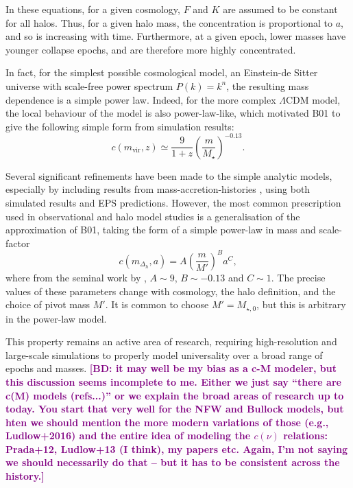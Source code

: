 \documentclass[5p]{elsarticle}
\newcommand{\bd}[1]{\textcolor{purple}{\textbf{[BD: #1]}}}
\begin{document}
In these equations, for a given cosmology, $F$ and $K$ are assumed to be constant for all halos. Thus, for a given halo mass, the concentration is proportional to $a$, and so is increasing with time. Furthermore, at a given epoch, lower masses have younger collapse epochs, and are therefore more highly concentrated. 

In fact, for the simplest possible cosmological model, an Einstein-de Sitter universe with scale-free power spectrum $P(k) = k^n$, the resulting mass dependence is a simple power law. Indeed, for the more complex $\Lambda$CDM model, the local behaviour of the model is also power-law-like, which motivated B01 to give the following simple form from simulation results:
\begin{equation}
    c(m_\text{vir},z) \simeq \frac{9}{1+z}\left(\frac{m}{M_\star}\right)^{-0.13}.
\end{equation}

Several significant refinements have been made to the simple analytic models, especially by including results from mass-accretion-histories \citep[MAHs,][]{Wechsler2002,Zhao2003,Zhao2009,Correa2015,Correa2015a,Correa2015b,Wang2020}, using both simulated results and EPS predictions.
However, the most common prescription used in observational and halo model studies is a generalisation of the approximation of B01, taking the form of a simple power-law in mass and scale-factor \citep{Dolag2004,Kuhlen2005,Buote2007,Comerford2007,Maccio2007,Neto2007,Duffy2008,Maccio2008}
\begin{equation}
    c(m_{\Delta_h},a) = A\left(\frac{m}{M'}\right)^B a^C,
\end{equation}
where from the seminal work by \citet{Bullock2001}, $A \sim 9$, $B \sim -0.13$ and $C \sim 1$. The precise values of these parameters change with cosmology, the halo definition, and the choice of pivot mass $M'$. It is common to choose $M' = M_{\star,0}$, but this is arbitrary in the power-law model.

This property remains an active area of research, requiring high-resolution and large-scale simulations to properly model universality over a broad range of epochs and masses. \bd{it may well be my bias as a c-M modeler, but this discussion seems incomplete to me. Either we just say ``there are c(M) models (refs...)'' or we explain the broad areas of research up to today. You start that very well for the NFW and Bullock models, but hten we should mention the more modern variations of those (e.g., Ludlow+2016) and the entire idea of modeling the $c(\nu)$ relations: Prada+12, Ludlow+13 (I think), my papers etc. Again, I'm not saying we should necessarily do that -- but it has to be consistent across the history.}
\end{document}
